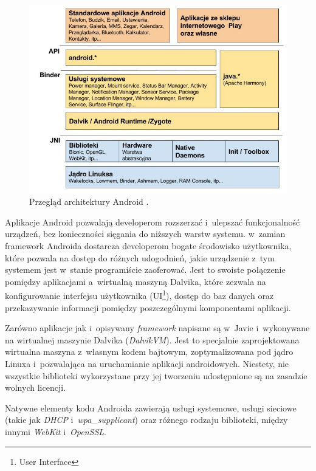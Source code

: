 \begin{figure}[!htb]
    \centering
    \includegraphics[width=14cm]{imgs/ch3_android_architecture_1.jpg}
    \caption
{Przegląd architektury Android \cite{website:android:przegladarchitektury}.}
    \label{fig:ch3_android_architecture_1}
\end{figure} 

Aplikacje Android pozwalają developerom rozszerzać i~ulepszać funkcjonalność urządzeń, bez konieczności sięgania do niższych warstw systemu. w~zamian framework Androida dostarcza developerom bogate środowisko użytkownika, które pozwala na dostęp do różnych udogodnień, jakie urządzenie z~tym systemem jest w~stanie programiście zaoferować. Jest to swoiste połączenie pomiędzy aplikacjami a~wirtualną maszyną Dalvika, które zezwala na konfigurowanie interfejsu użytkownika (UI\footnote{User Interface}), dostęp do baz danych oraz przekazywanie informacji pomiędzy poszczególnymi komponentami aplikacji.

Zarówno aplikacje jak i~opisywany \textit{framework} napisane są w~Javie i~wykonywane na wirtualnej maszynie Dalvika (\textit{DalvikVM}). Jest to specjalnie zaprojektowana wirtualna maszyna z~własnym kodem bajtowym, zoptymalizowana pod jądro Linuxa i~pozwalająca na uruchamianie aplikacji androidowych. Niestety, nie wszystkie biblioteki wykorzystane przy jej tworzeniu udostępnione są na zasadzie wolnych licencji.

Natywne elementy kodu Androida zawierają usługi systemowe, usługi sieciowe (takie jak \textit{DHCP} i~\textit{wpa\_supplicant}) oraz różnego rodzaju biblioteki, między innymi \textit{WebKit} i~\textit{OpenSSL}. 

